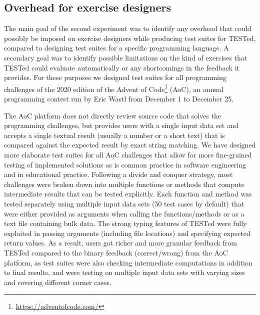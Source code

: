 \documentclass[../main]{subfiles}
\begin{document}
\subsection{Overhead for exercise designers}\label{subsec:overhead-for-exercise-designers}

The main goal of the second experiment was to identify any overhead that could possibly be imposed on exercise designers while producing test suites for TESTed, compared to designing test suites for a specific programming language.
A secondary goal was to identify possible limitations on the kind of exercises that TESTed could evaluate automatically or any shortcomings in the feedback it provides.
For these purposes we designed test suites for all programming challenges of the 2020 edition of the Advent of Code\footnote{\url{https://adventofcode.com/}} (AoC), an annual programming contest run by Eric Wastl from December 1 to December 25.

The AoC platform does not directly review source code that solves the programming challenges, but provides users with a single input data set and accepts a single textual result (usually a number or a short text) that is compared against the expected result by exact string matching.
We have designed more elaborate test suites for all AoC challenges that allow for more fine-grained testing of implemented solutions as is common practice in software engineering and in educational practice.
Following a divide and conquer strategy, most challenges were broken down into multiple functions or methods that compute intermediate results that can be tested explicitly.
Each function and method was tested separately using multiple input data sets (50 test cases by default) that were either provided as arguments when calling the functions/methods or as a text file containing bulk data.
The strong typing features of TESTed were fully exploited in passing arguments (including file locations) and specifying expected return values.
As a result, users got richer and more granular feedback from TESTed compared to the binary feedback (correct/wrong) from the AoC platform, as test suites were also checking intermediate computations in addition to final results, and were testing on multiple input data sets with varying sizes and covering different corner cases.
\end{document}
